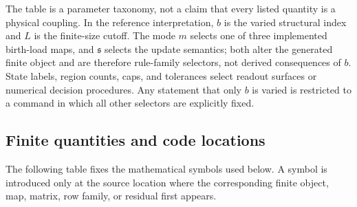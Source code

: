 \documentclass[11pt]{article}
\theoremstyle{remark}
\numberwithin{equation}{section}
\begin{document}
The table is a parameter taxonomy, not a claim that every listed quantity is a physical coupling. In the reference interpretation, \(b\) is the varied structural index and \(L\) is the finite-size cutoff. The mode \(m\) selects one of three implemented birth-load maps, and \(\mathfrak{s}\) selects the update semantics; both alter the generated finite object and are therefore rule-family selectors, not derived consequences of \(b\). State labels, region counts, caps, and tolerances select readout surfaces or numerical decision procedures. Any statement that only \(b\) is varied is restricted to a command in which all other selectors are explicitly fixed.

\subsection{Finite quantities and code locations}
The following table fixes the mathematical symbols used below. A symbol is introduced only at the source location where the corresponding finite object, map, matrix, row family, or residual first appears.
\setlength{\tabcolsep}{3pt}
\end{document}
